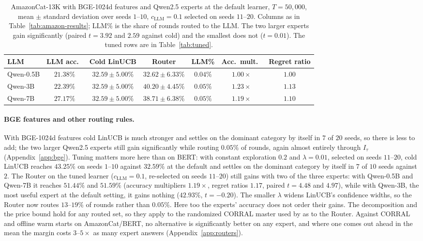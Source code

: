 \documentclass[anon]{alt2027} %
\begin{document}
\begin{table}[h]
\centering
\caption{AmazonCat-13K with BGE-1024d features and Qwen2.5 experts at the
default learner, $T=50{,}000$, mean $\pm$ standard deviation over seeds
$1$--$10$, $c_{\mathrm{LLM}}=0.1$ selected on seeds $11$--$20$. Columns as in
Table~\ref{tab:amazon-results}; LLM\% is the share of rounds routed to the
LLM. The two larger experts gain significantly (paired $t=3.92$ and $2.59$
against cold) and the smallest does not ($t=0.01$). The tuned rows are in
Table~\ref{tab:tuned}.}
\label{tab:bge-main}
\small
\setlength{\tabcolsep}{3pt}
\begin{tabular}{@{}lcccccc@{}}
\toprule
LLM & LLM acc.\ & Cold LinUCB & Router & LLM\% & Acc.\ mult.\ & Regret ratio \\
\midrule
Qwen-0.5B  & $21.38\%$ & $32.59\pm5.00\%$ & $32.62\pm6.33\%$ & $0.04\%$  & $1.00\times$ & $1.00$ \\
Qwen-3B  & $22.39\%$ & $32.59\pm5.00\%$ & $\mathbf{40.20\pm4.45\%}$ & $0.05\%$  & $\mathbf{1.23\times}$ & $\mathbf{1.13}$ \\
Qwen-7B  & $27.17\%$ & $32.59\pm5.00\%$ & $38.71\pm6.38\%$ & $0.05\%$  & $1.19\times$ & $1.10$ \\
\bottomrule
\end{tabular}
\end{table}

\paragraph{BGE features and other routing rules.}
With BGE-1024d features cold LinUCB is much stronger and settles on the
dominant category by itself in $7$ of $20$ seeds, so there is less to add; the
two larger Qwen2.5 experts still gain significantly while routing $0.05\%$ of
rounds, again almost entirely through $I_\tau$ (Appendix~\ref{app:bge}).
Tuning matters more here than on BERT: with constant exploration $0.2$ and
$\lambda=0.01$, selected on seeds $11$--$20$, cold LinUCB reaches $43.25\%$
on seeds $1$--$10$ against $32.59\%$ at the default and settles on the
dominant category by itself in $7$ of $10$ seeds against $2$. The Router on
the tuned learner ($c_{\mathrm{LLM}}=0.1$, re-selected on seeds $11$--$20$) still gains
with two of the three experts: with Qwen-0.5B and Qwen-7B it reaches
$51.44\%$ and $51.59\%$ (accuracy multipliers $1.19\times$, regret ratios
$1.17$, paired $t=4.48$ and $4.97$), while with Qwen-3B, the most useful
expert at the default setting, it gains nothing ($42.93\%$, $t=-0.20$). The
smaller $\lambda$ widens LinUCB's confidence widths, so the Router now routes
$13$--$19\%$ of rounds rather than $0.05\%$. Here too the experts' accuracy
does not order their gains. The
decomposition and the price bound hold for any routed set, so they apply to
the randomized CORRAL master \citep{agarwal2017corralling} used by
\citet{chen2024llmdecision} as to the Router. Against CORRAL and offline warm
starts on AmazonCat/BERT, no alternative is significantly better on any
expert, and where one comes out ahead in the mean the margin costs $3$--$5\times$
as many expert answers (Appendix~\ref{app:routers}).
\end{document}
